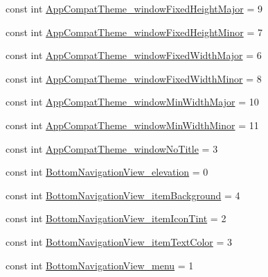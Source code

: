 \begin{DoxyCompactItemize}
\item 
const int \mbox{\hyperlink{class_f_w_p_s___app_1_1_droid_1_1_resource_1_1_styleable_ac021546b5a91883892dd0b127b2c364e}{App\+Compat\+Theme\+\_\+window\+Fixed\+Height\+Major}} = 9
\item 
const int \mbox{\hyperlink{class_f_w_p_s___app_1_1_droid_1_1_resource_1_1_styleable_ae1a174b589ab78ba71b049bdb56a25de}{App\+Compat\+Theme\+\_\+window\+Fixed\+Height\+Minor}} = 7
\item 
const int \mbox{\hyperlink{class_f_w_p_s___app_1_1_droid_1_1_resource_1_1_styleable_ae3f38696e09b131e0decd65773de8a14}{App\+Compat\+Theme\+\_\+window\+Fixed\+Width\+Major}} = 6
\item 
const int \mbox{\hyperlink{class_f_w_p_s___app_1_1_droid_1_1_resource_1_1_styleable_a8bf4787d855b80aa060101382ceccda8}{App\+Compat\+Theme\+\_\+window\+Fixed\+Width\+Minor}} = 8
\item 
const int \mbox{\hyperlink{class_f_w_p_s___app_1_1_droid_1_1_resource_1_1_styleable_aa760b7ebca5ac93c672df49c651e21ce}{App\+Compat\+Theme\+\_\+window\+Min\+Width\+Major}} = 10
\item 
const int \mbox{\hyperlink{class_f_w_p_s___app_1_1_droid_1_1_resource_1_1_styleable_aa50b972f5e6366cb381d0655c2d3b748}{App\+Compat\+Theme\+\_\+window\+Min\+Width\+Minor}} = 11
\item 
const int \mbox{\hyperlink{class_f_w_p_s___app_1_1_droid_1_1_resource_1_1_styleable_a3ee16ad1e66b2407722b3a0df3688ef3}{App\+Compat\+Theme\+\_\+window\+No\+Title}} = 3
\item 
const int \mbox{\hyperlink{class_f_w_p_s___app_1_1_droid_1_1_resource_1_1_styleable_a45b60b6bddb8bc50401bd3016fd262b9}{Bottom\+Navigation\+View\+\_\+elevation}} = 0
\item 
const int \mbox{\hyperlink{class_f_w_p_s___app_1_1_droid_1_1_resource_1_1_styleable_a1b334d79f2ae749aeb1d3223d05ad420}{Bottom\+Navigation\+View\+\_\+item\+Background}} = 4
\item 
const int \mbox{\hyperlink{class_f_w_p_s___app_1_1_droid_1_1_resource_1_1_styleable_afe9897139f36f0d677e4f6fecca08f15}{Bottom\+Navigation\+View\+\_\+item\+Icon\+Tint}} = 2
\item 
const int \mbox{\hyperlink{class_f_w_p_s___app_1_1_droid_1_1_resource_1_1_styleable_a33c18940e472f63ea5fb78ee44413260}{Bottom\+Navigation\+View\+\_\+item\+Text\+Color}} = 3
\item 
const int \mbox{\hyperlink{class_f_w_p_s___app_1_1_droid_1_1_resource_1_1_styleable_ab961a6e662728e5b777c485722a9e9f7}{Bottom\+Navigation\+View\+\_\+menu}} = 1

\end{DoxyCompactItemize}
